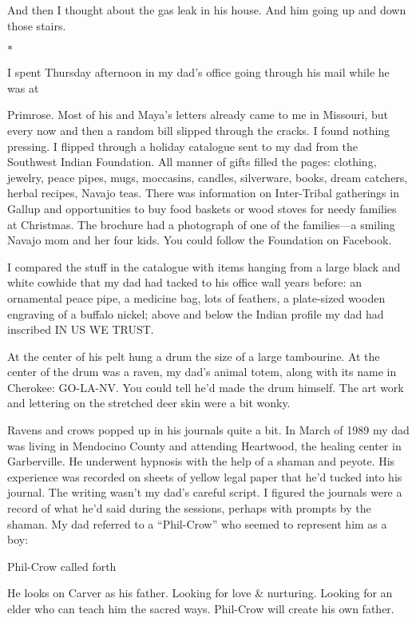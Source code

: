 \documentclass[12pt]{book}
\begin{document}
And then I thought about the gas leak in his house. And him going up and down those stairs.

\begin{center}$*$\end{center}

I spent Thursday afternoon in my dad's office going through his mail while he was at

Primrose. Most of his and Maya's letters already came to me in Missouri, but every now and then a random bill slipped through the cracks. I found nothing pressing. I flipped through a holiday catalogue sent to my dad from the Southwest Indian Foundation. All manner of gifts filled the pages: clothing, jewelry, peace pipes, mugs, moccasins, candles, silverware, books, dream catchers, herbal recipes, Navajo teas. There was information on Inter-Tribal gatherings in Gallup and opportunities to buy food baskets or wood stoves for needy families at Christmas. The brochure had a photograph of one of the families---a smiling Navajo mom and her four kids. You could follow the Foundation on Facebook.

I compared the stuff in the catalogue with items hanging from a large black and white cowhide that my dad had tacked to his office wall years before: an ornamental peace pipe, a medicine bag, lots of feathers, a plate-sized wooden engraving of a buffalo nickel; above and below the Indian profile my dad had inscribed IN US WE TRUST.

At the center of his pelt hung a drum the size of a large tambourine. At the center of the drum was a raven, my dad's animal totem, along with its name in Cherokee: GO-LA-NV. You could tell he'd made the drum himself. The art work and lettering on the stretched deer skin were a bit wonky.

Ravens and crows popped up in his journals quite a bit. In March of 1989 my dad was living in Mendocino County and attending Heartwood, the healing center in Garberville. He underwent hypnosis with the help of a shaman and peyote. His experience was recorded on sheets of yellow legal paper that he'd tucked into his journal. The writing wasn't my dad's careful script. I figured the journals were a record of what he'd said during the sessions, perhaps with prompts by the shaman. My dad referred to a ``Phil-Crow'' who seemed to represent him as a boy:

Phil-Crow called forth

He looks on Carver as his father. Looking for love \& nurturing. Looking for an elder who can teach him the sacred ways. Phil-Crow will create his own father.
\end{document}
